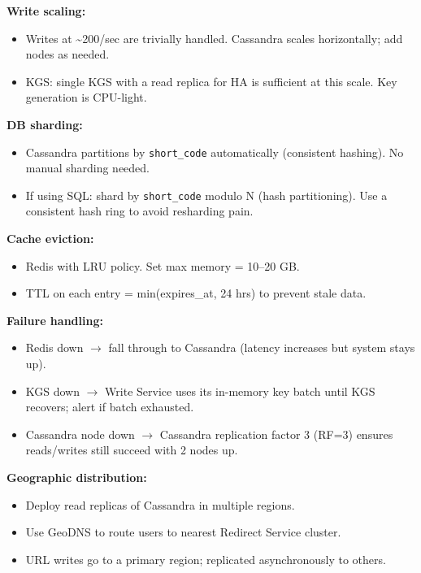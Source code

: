 \documentclass[11pt]{article}
\providecommand{\tightlist}{\setlength{\itemsep}{1pt}\setlength{\parskip}{0pt}}
\begin{document}
\textbf{Write scaling:}

\begin{itemize}
\tightlist
\item
  Writes at \textasciitilde200/sec are trivially handled. Cassandra scales horizontally; add nodes as needed.
\item
  KGS: single KGS with a read replica for HA is sufficient at this scale. Key generation is CPU-light.
\end{itemize}

\textbf{DB sharding:}

\begin{itemize}
\tightlist
\item
  Cassandra partitions by \texttt{short\_code} automatically (consistent hashing). No manual sharding needed.
\item
  If using SQL: shard by \texttt{short\_code} modulo N (hash partitioning). Use a consistent hash ring to avoid resharding pain.
\end{itemize}

\textbf{Cache eviction:}

\begin{itemize}
\tightlist
\item
  Redis with LRU policy. Set max memory = 10--20 GB.
\item
  TTL on each entry = min(expires\_at, 24 hrs) to prevent stale data.
\end{itemize}

\textbf{Failure handling:}

\begin{itemize}
\tightlist
\item
  Redis down \(\rightarrow\) fall through to Cassandra (latency increases but system stays up).
\item
  KGS down \(\rightarrow\) Write Service uses its in-memory key batch until KGS recovers; alert if batch exhausted.
\item
  Cassandra node down \(\rightarrow\) Cassandra replication factor 3 (RF=3) ensures reads/writes still succeed with 2 nodes up.
\end{itemize}

\textbf{Geographic distribution:}

\begin{itemize}
\tightlist
\item
  Deploy read replicas of Cassandra in multiple regions.
\item
  Use GeoDNS to route users to nearest Redirect Service cluster.
\item
  URL writes go to a primary region; replicated asynchronously to others.
\end{itemize}
\end{document}
